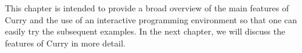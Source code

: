 This chapter is intended to provide a broad overview
of the main features of Curry and the use of an interactive
programming environment so that one can easily try the subsequent
examples. In the next chapter, we will discuss the features
of Curry in more detail.


